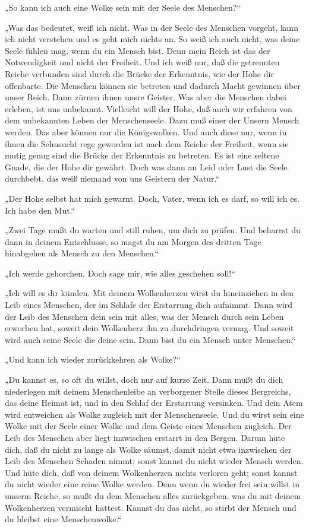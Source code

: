 „So kann ich auch eine Wolke sein mit der Seele des Menschen?“

„Was das bedeutet, weiß ich nicht. Was in der Seele des Menschen
vorgeht, kann ich nicht verstehen und es geht mich nichts an. So
weiß ich auch nicht, was deine Seele fühlen mag, wenn du ein Mensch
bist. Denn mein Reich ist das der Notwendigkeit und nicht der
Freiheit. Und ich weiß nur, daß die getrennten Reiche verbunden
sind durch die Brücke der Erkenntnis, wie der Hohe dir offenbarte.
Die Menschen können sie betreten und dadurch Macht gewinnen über
unser Reich. Dann zürnen ihnen unsre Geister. Was aber die Menschen
dabei erleben, ist uns unbekannt. Vielleicht will der Hohe, daß
auch wir erfahren von dem unbekannten Leben der Menschenseele. Dazu
muß einer der Unsern Mensch werden. Das aber können nur die
Königswolken. Und auch diese nur, wenn in ihnen die Sehnsucht rege
geworden ist nach dem Reiche der Freiheit, wenn sie mutig genug
sind die Brücke der Erkenntnis zu betreten. Es ist eine seltene
Gnade, die der Hohe dir gewährt. Doch was dann an Leid oder Lust
die Seele durchbebt, das weiß niemand von uns Geistern der Natur.“

„Der Hohe selbst hat mich gewarnt. Doch, Vater, wenn ich es darf,
so will ich es. Ich habe den Mut.“

„Zwei Tage mußt du warten und still ruhen, um dich zu prüfen. Und
beharrst du dann in deinem Entschlusse, so magst du am Morgen des
dritten Tage hinabgehen als Mensch zu den Menschen.“

„Ich werde gehorchen. Doch sage mir, wie alles geschehen soll!“

„Ich will es dir künden. Mit deinem Wolkenherzen wirst du
hineinziehen in den Leib eines Menschen, der im Schlafe der
Erstarrung dich aufnimmt. Dann wird der Leib des Menschen dein sein
mit alles, was der Mensch durch sein Leben erworben hat, soweit
dein Wolkenherz ihn zu durchdringen vermag. Und soweit wird auch
seine Seele die deine sein. Dann bist du ein Mensch unter
Menschen.“

„Und kann ich wieder zurückkehren als Wolke?“

„Du kannst es, so oft du willst, doch nur auf kurze Zeit. Dann mußt
du dich niederlegen mit deinem Menschenleibe an verborgener Stelle
dieses Bergreichs, das deine Heimat ist, und in den Schlaf der
Erstarrung versinken. Und dein Atem wird entweichen als Wolke
zugleich mit der Menschenseele. Und du wirst sein eine Wolke mit
der Seele einer Wolke und dem Geiste eines Menschen zugleich. Der
Leib des Menschen aber liegt inzwischen erstarrt in den Bergen.
Darum hüte dich, daß du nicht zu lange als Wolke säumst, damit
nicht etwa inzwischen der Leib des Menschen Schaden nimmt; sonst
kannst du nicht wieder Mensch werden. Und hüte dich, daß von deinem
Wolkenherzen nichts verloren geht; sonst kannst du nicht wieder
eine reine Wolke werden. Denn wenn du wieder frei sein willst in
unserm Reiche, so mußt du dem Menschen alles zurückgeben, was du
mit deinem Wolkenherzen vermischt hattest. Kannst du das nicht, so
stirbt der Mensch und du bleibst eine Menschenwolke.“

